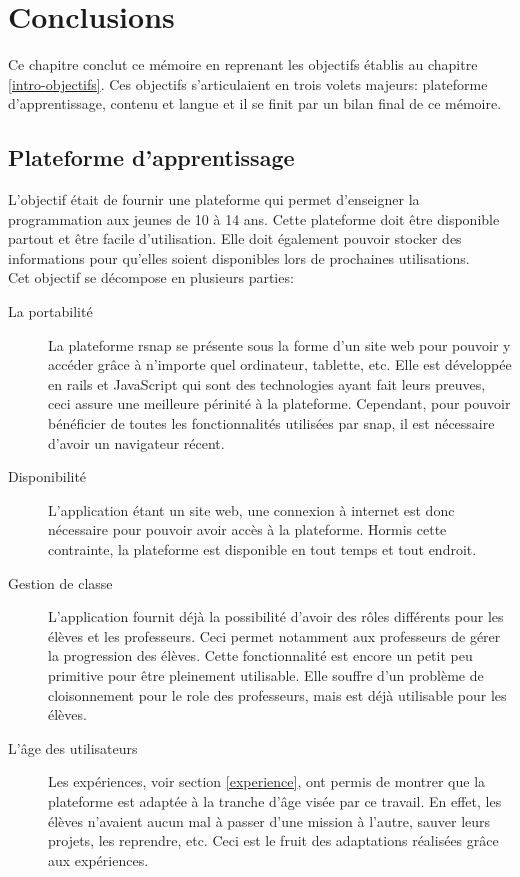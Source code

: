 \chapter{Conclusions}
Ce chapitre conclut ce mémoire en reprenant les objectifs établis au chapitre \ref{intro-objectifs}. Ces objectifs s'articulaient en trois volets majeurs: plateforme d'apprentissage, contenu et langue et il se finit par un bilan final de ce mémoire.
\section{Plateforme d'apprentissage}
L'objectif était de fournir une plateforme qui permet d'enseigner la programmation aux jeunes de 10 à 14 ans. Cette plateforme doit être disponible partout et être facile d'utilisation. Elle doit également pouvoir stocker des informations pour qu'elles soient disponibles lors de prochaines utilisations.\\

Cet objectif se décompose en plusieurs parties:
\begin{description}
  \item[La portabilité] La plateforme \gls{rsnap} se présente sous la forme d'un site web \cite{rsnap} pour pouvoir y accéder grâce à n'importe quel ordinateur, tablette, etc. Elle est développée en \gls{rails} et JavaScript qui sont des technologies ayant fait leurs preuves, ceci assure une meilleure périnité à la plateforme. Cependant, pour pouvoir bénéficier de toutes les fonctionnalités utilisées par \gls{snap}, il est nécessaire d'avoir un navigateur récent.

  \item[Disponibilité] L'application étant un site web, une connexion à internet est donc nécessaire pour pouvoir avoir accès à la plateforme. Hormis cette contrainte, la plateforme est disponible en tout temps et tout endroit.

  \item[Gestion de classe] L'application fournit déjà la possibilité d'avoir des rôles différents pour les élèves et les professeurs. Ceci permet notamment aux professeurs de gérer la progression des élèves. Cette fonctionnalité est encore un petit peu primitive pour être pleinement utilisable. Elle souffre d'un problème de cloisonnement pour le \gls{role} des professeurs, mais est déjà utilisable pour les élèves.

  \item[L'âge des utilisateurs] Les expériences, voir section \ref{experience}, ont permis de montrer que la plateforme est adaptée à la tranche d'âge visée par ce travail. En effet, les élèves n'avaient aucun mal à passer d'une \gls{mission} à l'autre, sauver leurs projets, les reprendre, etc. Ceci est le fruit des adaptations réalisées grâce aux expériences.
\end{description}

